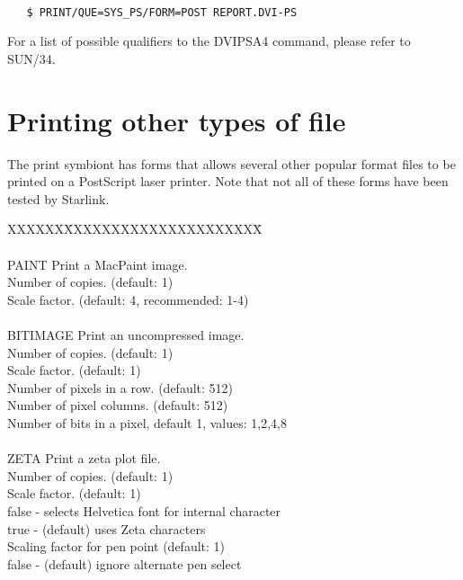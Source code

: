 \begin{verbatim}

   $ PRINT/QUE=SYS_PS/FORM=POST REPORT.DVI-PS

\end{verbatim}

For a list of possible qualifiers to the DVIPSA4 command, please refer to
SUN/34.


\section{Printing other types of file}

The print symbiont has forms that allows several other popular format files to be
printed on a PostScript laser printer. Note that not all of these forms have 
been tested by Starlink.

\begin{tabbing}
XXXXXX\=XXXXXXXXXXXXXXXXXXXXX\= \kill
{}            \\
\\
\>PAINT     \>  Print a MacPaint image.\\
            \>   Number of copies. (default: 1)\\
            \>     Scale factor. (default: 4, recommended: 1-4)\\
\\
\>BITIMAGE \>  Print an uncompressed image.\\
       \>  Number of copies. (default: 1)\\
       \>  Scale factor. (default: 1)\\
       \>  Number of pixels in a row. (default: 512)\\
       \>  Number of pixel columns. (default: 512)\\
       \>  Number of bits in a pixel, default 1, values: 1,2,4,8\\
\\
\>ZETA \>  Print a zeta plot file.\\
       \>  Number of copies. (default: 1)\\
       \>  Scale factor. (default: 1)\\
       \>  false - selects Helvetica font for internal character\\
       \>\>         true -  (default) uses Zeta characters\\
       \> Scaling factor for pen point (default: 1)\\
       \>  false - (default) ignore alternate pen select\\
\end{tabbing}


